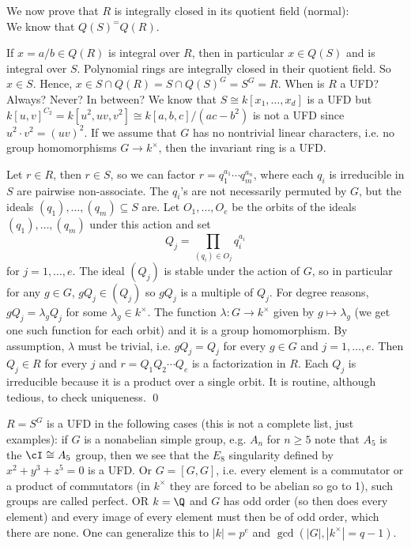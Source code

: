 We now prove that $R$ is integrally closed in its quotient field (normal): \\


We know that $Q(S)^= Q(R)$. 




If $x=a/b \in Q(R)$ is integral over $R$, then in particular $x \in Q(S)$ and is integral over $S$. Polynomial rings are integrally closed in their quotient field. So $x \in S$. Hence, $x \in S \cap Q(R)= S \cap Q(S)^G= S^G= R$. When is $R$ a UFD? Always? Never? In between? We know that $S \cong k[x_1,\ldots,x_d]$ is a UFD but $k[u,v]^{C_2}= k[u^2,uv,v^2] \cong k[a,b,c]/(ac-b^2)$ is not a UFD since $u^2 \cdot v^2= (uv)^2$. If we assume that $G$ has no nontrivial linear characters, i.e. no group homomorphisms $G \to k^\times$, then the invariant ring is a UFD. 

\pf Let $r \in R$, then $r \in S$, so we can factor $r= q_1^{a_1} \cdots q_m^{a_n}$, where each $q_i$ is irreducible in $S$ are pairwise non-associate. The $q_i$'s are not necessarily permuted by $G$, but the ideals $(q_1),\ldots,(q_m) \subseteq S$ are. Let $O_1,\ldots,O_e$ be the orbits of the ideals $(q_1),\ldots,(q_m)$ under this action and set
	\[
	Q_j = \prod_{(q_i) \in O_j} q_i^{a_i}
	\]
for $j=1,\ldots,e$. The ideal $(Q_j)$ is stable under the action of $G$, so in particular for any $g \in G$, $gQ_j \in (Q_j)$ so $gQ_j$ is a multiple of $Q_j$. For degree reasons, $gQ_j= \lambda_g Q_j$ for some $\lambda_g \in k^\times$. The function $\lambda: G \to k^\times$ given by $g \mapsto \lambda_g$ (we get one such function for each orbit) and it is a group homomorphism. By assumption, $\lambda$ must be trivial, i.e. $gQ_j= Q_j$ for every $g \in G$ and $j=1,\ldots,e$. Then $Q_j \in R$ for every $j$ and $r= Q_1Q_2 \cdots Q_e$ is a factorization in $R$. Each $Q_j$ is irreducible because it is a product over a single orbit. It is routine, although tedious, to check uniqueness. \qed \\


\begin{ex}
$R= S^G$ is a UFD in the following cases (this is not a complete list, just examples): if $G$ is a nonabelian simple group, e.g. $A_n$ for $n \geq 5$ note that $A_5$ is the $\cI \cong A_5$ group, then we see that the $E_8$ singularity defined by $x^2+y^3+z^5=0$ is a UFD. Or $G= [G,G]$, i.e. every element is a commutator or a product of commutators (in $k^\times$ they are forced to be abelian so go to 1), such groups are called perfect. OR $k= \Q$ and $G$ has odd order (so then does every element) and every image of every element must then be of odd order, which there are none. One can generalize this to $|k|= p^e$ and $\gcd(|G|,|k^\times|=q-1)$. 
\end{ex}


